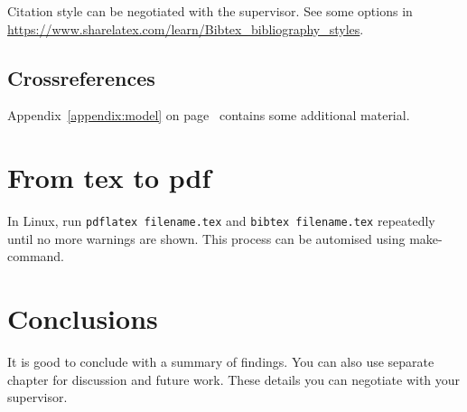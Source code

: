 Citation style can be negotiated with the supervisor. See some options in \url{https://www.sharelatex.com/learn/Bibtex_bibliography_styles}.

\section{Crossreferences}

Appendix~\ref{appendix:model} on page~\pageref{appendix:model} contains some additional material.

\chapter{From tex to pdf}

In Linux, run \texttt{pdflatex filename.tex} and \texttt{bibtex filename.tex} repeatedly until no more warnings are shown. This process can be automised using make-command.
 
\chapter{Conclusions\label{chapter:conclusions}}

It is good to conclude with a summary of findings. You can also use separate chapter for discussion and future work. These details you can negotiate with your supervisor.

